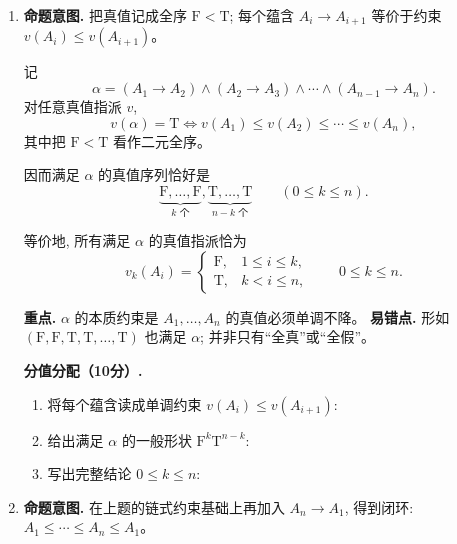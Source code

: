 \documentclass[a4paper, justified]{tufte-handout}
\newenvironment{intention}
  {\par\smallskip\noindent\textbf{命题意图. }\ignorespaces}
  {\par\smallskip}
\begin{document}
\begin{solution}
  \begin{enumerate}[(1)]
    \item
      \begin{intention}
        把真值记成全序 $\mathrm{F} < \mathrm{T}$; 每个蕴含 $A_i \to A_{i+1}$
        等价于约束 $v(A_i) \le v(A_{i+1})$。
      \end{intention}

      记
      \[
        \alpha = (A_1 \to A_2) \land (A_2 \to A_3) \land \cdots \land (A_{n-1} \to A_n).
      \]
      对任意真值指派 $v$,
      \[
        v(\alpha) = \mathrm{T}
        \iff
        v(A_1) \le v(A_2) \le \cdots \le v(A_n),
      \]
      其中把 $\mathrm{F} < \mathrm{T}$ 看作二元全序。

      因而满足 $\alpha$ 的真值序列恰好是
      \[
        \underbrace{\mathrm{F}, \dots, \mathrm{F}}_{k\text{ 个}},
        \underbrace{\mathrm{T}, \dots, \mathrm{T}}_{n-k\text{ 个}}
        \qquad (0 \le k \le n).
      \]

      等价地, 所有满足 $\alpha$ 的真值指派恰为
      \[
        v_k(A_i) =
        \begin{cases}
          \mathrm{F}, & 1 \le i \le k, \\
          \mathrm{T}, & k < i \le n,
        \end{cases}
        \qquad 0 \le k \le n.
      \]

      \begin{remark}
        \textbf{重点.} $\alpha$ 的本质约束是
        $A_1, \dots, A_n$ 的真值必须单调不降。
        \textbf{易错点.} 形如
        $(\mathrm{F}, \mathrm{F}, \mathrm{T}, \mathrm{T}, \dots, \mathrm{T})$
        也满足 $\alpha$; 并非只有“全真”或“全假”。
      \end{remark}

      \textbf{分值分配（10分）.}
      \begin{enumerate}[(1)]
        \item 将每个蕴含读成单调约束 $v(A_i) \le v(A_{i+1})$: 
        \item 给出满足 $\alpha$ 的一般形状 $\mathrm{F}^k\mathrm{T}^{n-k}$: 
        \item 写出完整结论 $0 \le k \le n$: 
      \end{enumerate}

    \item
      \begin{intention}
        在上题的链式约束基础上再加入 $A_n \to A_1$, 得到闭环:
        $A_1 \le \cdots \le A_n \le A_1$。
      \end{intention}


\end{enumerate}
\end{solution}
\end{document}
